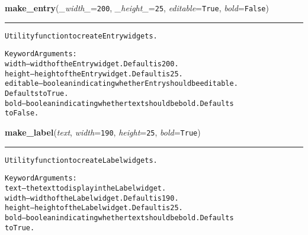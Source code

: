 \hspace{.8\funcindent}\begin{boxedminipage}{\funcwidth}

    \raggedright \textbf{make\_entry}(\textit{\_width\_}={\tt 200}, \textit{\_height\_}={\tt 25}, \textit{editable}={\tt True}, \textit{bold}={\tt False})

    \vspace{-1.5ex}

    \rule{\textwidth}{0.5\fboxrule}
\setlength{\parskip}{2ex}
\begin{alltt}
Utility function to create Entry widgets.

Keyword Arguments:
   width -- width of the Entry widget.  Default is 200.
  height -- height of the Entry widget.  Default is 25.
editable -- boolean indicating whether Entry should be editable.
            Defaults to True.
    bold -- boolean indicating whether text should be bold.  Defaults
            to False.
\end{alltt}

\setlength{\parskip}{1ex}
    \end{boxedminipage}

    \label{reliafree:widgets:make_label}

    \vspace{0.5ex}

\hspace{.8\funcindent}\begin{boxedminipage}{\funcwidth}

    \raggedright \textbf{make\_label}(\textit{text}, \textit{width}={\tt 190}, \textit{height}={\tt 25}, \textit{bold}={\tt True})

    \vspace{-1.5ex}

    \rule{\textwidth}{0.5\fboxrule}
\setlength{\parskip}{2ex}
\begin{alltt}
Utility function to create Label widgets.

Keyword Arguments:
text   -- the text to display in the Label widget.
width  -- width of the Label widget.  Default is 190.
height -- height of the Label widget.  Default is 25.
bold   -- boolean indicating whether text should be bold.  Defaults
          to True.
\end{alltt}

\setlength{\parskip}{1ex}
    \end{boxedminipage}

